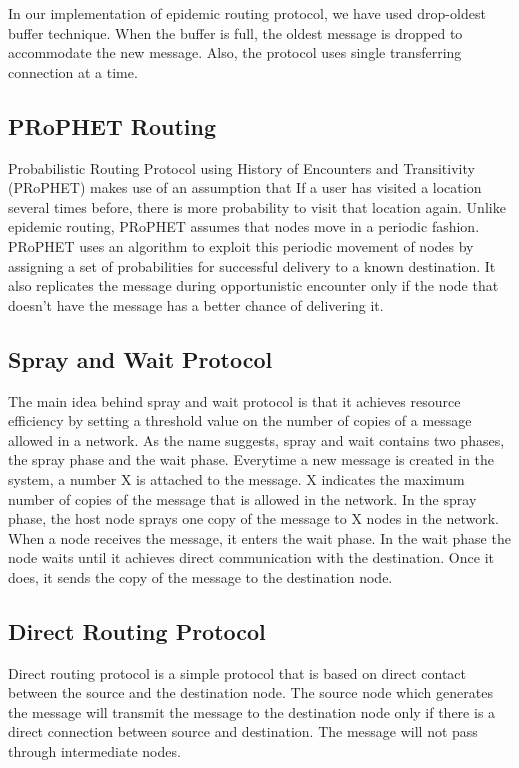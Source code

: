 \documentclass[conference]{IEEEtran}
\begin{document}
In our implementation of epidemic routing protocol, we have used drop-oldest buffer technique. When the buffer is full, the oldest message is dropped to accommodate the new message. Also, the protocol uses single transferring connection at a time. 

\subsection{PRoPHET Routing}
Probabilistic Routing Protocol using History of Encounters and Transitivity (PRoPHET) \cite{prob} makes use of an assumption that If a user has visited a location several times before, there is more probability to visit that location again. Unlike epidemic routing, PRoPHET assumes that nodes move in a periodic fashion. PRoPHET uses an algorithm to exploit this periodic movement of nodes by assigning a set of probabilities for successful delivery to a known destination. It also replicates the message during opportunistic encounter only if the node that doesn't have the message has a better chance of delivering it.

\subsection{Spray and Wait Protocol}
The main idea behind spray and wait protocol \cite{spray} is that it achieves resource efficiency by setting a threshold value on the number of copies of a message allowed in a network.
As the name suggests, spray and wait contains two phases, the spray phase and the wait phase. Everytime a new message is created in the system, a number X is attached to the message. X indicates the maximum number of copies of the message that is allowed in the network. In the spray phase, the host node sprays one copy of the message to X nodes in the network. When a node receives the message, it enters the wait phase. In the wait phase the node waits until it achieves direct communication with the destination. Once it does, it sends the copy of the message to the destination node.

\subsection{Direct Routing Protocol}
Direct routing protocol is a simple protocol that is based on direct contact between the source and the destination node. The source node which generates the message will transmit the message to the destination node only if there is a direct connection between source and destination. The message will not pass through intermediate nodes.
\end{document}
